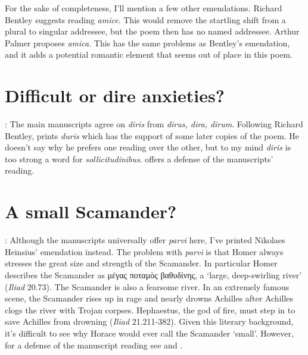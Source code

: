 For the sake of completeness, I'll mention a few other emendations.  Richard Bentley suggests reading \textit{amice}.  This would remove the startling shift from a plural to singular addressee, but the poem then has no named addressee.  Arthur Palmer proposes \textit{amica}.  This has the same problems as Bentley's emendation, and it adds a potential romantic element that seems out of place in this poem.


\section*{Difficult or dire anxieties?}


: The main manuscripts agree on \textit{diris} from \textit{dirus, dira, dirum}.  Following Richard Bentley, \citet{sb1985}  prints \textit{duris} which has the support of some later copies of the poem.  He doesn't say why he prefers one reading over the other, but to my mind \textit{diris} is too strong a word for \textit{sollicitudinibus}.  \citet[220]{mankin1995} offers a defense of the manuscripts' reading.


\section*{A small Scamander?}


: Although the manuscripts universally offer \textit{parvi} here, I've printed Nikolaes Heinsius' emendation instead.  The problem with \textit{parvi} is that Homer always stresses the great size and strength of the Scamander.  In particular Homer describes the Scamander as μέγας ποταμὸς βαθυδίνης, a `large, deep-swirling river' (\textit{Iliad} 20.73).  The Scamander is also a fearsome river.  In an extremely famous scene, the Scamander rises up in rage and nearly drowns Achilles after Achilles clogs the river with Trojan corpses.  Hephaestus, the god of fire, must step in to save Achilles from drowning (\textit{Iliad} 21.211-382).  Given this literary background, it's difficult to see why Horace would ever call the Scamander `small'.  However, for a defense of the manuscript reading see \citet[223--224]{mankin1995} and \citet[207--209]{gaskin2013}.

